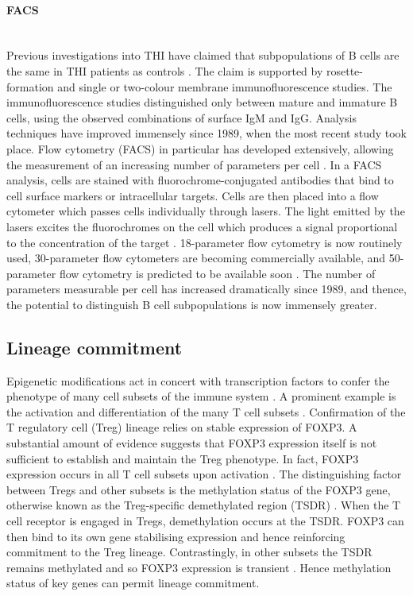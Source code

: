 \documentclass[12pt]{article}
\begin{document}
			
			
		\paragraph{FACS}
			~\\
			Previous investigations into THI have claimed that subpopulations of B cells are the same in THI patients as controls \citep{Tiller78,Stiemh80,Siegel81,Buckley83,Fiorilli86,Dressler89}. 
			The claim is supported by rosette-formation and single or two-colour membrane immunofluorescence studies. 
			The immunofluorescence studies distinguished only between mature and immature B cells, using the observed combinations of surface IgM and IgG. 
			Analysis techniques have improved immensely since 1989, when the most recent study took place.
			Flow cytometry (FACS) in particular has developed extensively, allowing the measurement of an increasing number of parameters per cell \citep{Saeys16}.
			In a FACS analysis, cells are stained with fluorochrome-conjugated antibodies that bind to cell surface markers or intracellular targets. 
			Cells are then placed into a flow cytometer which passes cells individually through lasers.
			The light emitted by the lasers excites the fluorochromes on the cell which produces a signal proportional to the concentration of the target \citep{Aghaeepour13}.
			18-parameter flow cytometry is now routinely used, 30-parameter flow cytometers are becoming commercially available, and 50-parameter flow cytometry is predicted to be available soon \citep{Saeys16}.
			The number of parameters measurable per cell has increased dramatically since 1989, and thence, the potential to distinguish B cell subpopulations is now immensely greater.

			
		\subsection{Lineage commitment}
			
			Epigenetic modifications act in concert with transcription factors to confer the phenotype of many cell subsets of the immune system \citep{Lara14,Zan15,Mercer11}. 
			A prominent example is the activation and differentiation of the many T cell subsets \citep{Begin14, Zeng13}. 
			Confirmation of the T regulatory cell (Treg) lineage relies on stable expression of FOXP3.
			A substantial amount of evidence suggests that FOXP3 expression itself is not sufficient to establish and maintain the Treg phenotype.
			In fact, FOXP3 expression occurs in all T cell subsets upon activation \citep{Ohkura13,Polansky08}.
			The distinguishing factor between Tregs and other subsets is the methylation status of the FOXP3 gene, otherwise known as the Treg-specific demethylated region (TSDR) \cite{Shimazu16}.
			When the T cell receptor is engaged in Tregs, demethylation occurs at the TSDR. 
			FOXP3 can then bind to its own gene stabilising expression and hence reinforcing commitment to the Treg lineage.
			Contrastingly, in other subsets the TSDR remains methylated and so FOXP3 expression is transient \citep{Ohkura13}.
			Hence methylation status of key genes can permit lineage commitment. 
			
\end{document}
